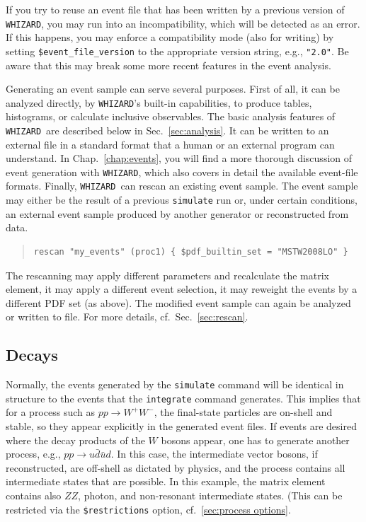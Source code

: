 \documentclass[12pt]{book}
\newcommand{\ttt}[1]{\texttt{#1}}
\newcommand{\whizard}{\ttt{WHIZARD}}
\begin{document}
If you try to reuse an event file that has been written by a previous version
of \whizard, you may run into an incompatibility, which will be detected as an
error.  If this happens, you may enforce a compatibility mode (also for
writing) by setting \ttt{\$event\_file\_version} to the appropriate version
string, e.g., \verb|"2.0"|.  Be aware that this may break some more recent
features in the event analysis.

Generating an event sample can serve several purposes.  First of all,
it can be analyzed directly, by \whizard's built-in capabilities, to
produce tables, histograms, or calculate inclusive observables.  The
basic analysis features of \whizard\ are described below in
Sec.~\ref{sec:analysis}.  It can be written to an external file in a
standard format that a human or an external program can understand.
In Chap.~\ref{chap:events}, you will find a more thorough discussion
of event generation with \whizard, which also covers in detail the
available event-file formats.  Finally, \whizard\ can rescan an
existing event sample.  The event sample may either be the result of a
previous \ttt{simulate} run or, under certain conditions, an external
event sample produced by another generator or reconstructed from
data.
\begin{quote}
\begin{footnotesize}
\begin{verbatim}
rescan "my_events" (proc1) { $pdf_builtin_set = "MSTW2008LO" }
\end{verbatim}
\end{footnotesize}
\end{quote}
The rescanning may apply different parameters and recalculate the
matrix element, it may apply a different event selection, it may
reweight the events by a different PDF set (as above).  The modified
event sample can again be analyzed or written to file.  For more
details, cf.\ Sec.~\ref{sec:rescan}.


\subsection{Decays}
\label{sec:decays}

Normally, the events generated by the \ttt{simulate} command will be identical
in structure to the events that the \ttt{integrate} command generates.  This
implies that for a process such as $pp\to W^+W^-$, the final-state particles
are on-shell and stable, so they appear explicitly in the generated event
files.  If events are desired where the decay products of the $W$ bosons
appear, one has to generate another process, e.g., $pp\to u\bar d\bar ud$.  In
this case, the intermediate vector bosons, if reconstructed, are off-shell as
dictated by physics, and the process contains all intermediate states that are
possible.  In this example, the matrix element contains also $ZZ$, photon, and
non-resonant intermediate states.  (This can be restricted via the
\verb|$restrictions| option, cf.\ \ref{sec:process options}.
\end{document}
